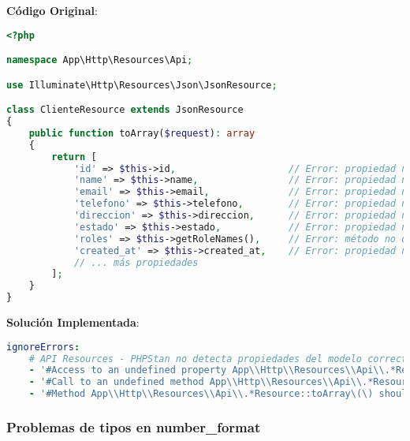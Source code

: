 \documentclass[12pt,a4paper]{article}
\begin{document}
\textbf{Código Original}:
\begin{lstlisting}[language=php, caption=ClienteResource.php - Problema original]
<?php

namespace App\Http\Resources\Api;

use Illuminate\Http\Resources\Json\JsonResource;

class ClienteResource extends JsonResource
{
    public function toArray($request): array
    {
        return [
            'id' => $this->id,                    // Error: propiedad no detectada
            'name' => $this->name,                // Error: propiedad no detectada
            'email' => $this->email,              // Error: propiedad no detectada
            'telefono' => $this->telefono,        // Error: propiedad no detectada
            'direccion' => $this->direccion,      // Error: propiedad no detectada
            'estado' => $this->estado,            // Error: propiedad no detectada
            'roles' => $this->getRoleNames(),     // Error: método no detectado
            'created_at' => $this->created_at,    // Error: propiedad no detectada
            // ... más propiedades
        ];
    }
}
\end{lstlisting}

\textbf{Solución Implementada}:
\begin{lstlisting}[language=yaml, caption=Configuración en phpstan.neon]
ignoreErrors:
    # API Resources - PHPStan no detecta propiedades del modelo correctamente
    - '#Access to an undefined property App\\Http\\Resources\\Api\\.*Resource::\$.*#'
    - '#Call to an undefined method App\\Http\\Resources\\Api\\.*Resource::.*\(\)#'
    - '#Method App\\Http\\Resources\\Api\\.*Resource::toArray\(\) should return array<string, mixed> but returns array<int\|string, mixed>#'
\end{lstlisting}

\subsubsection{Problemas de tipos en number\_format}
\end{document}
